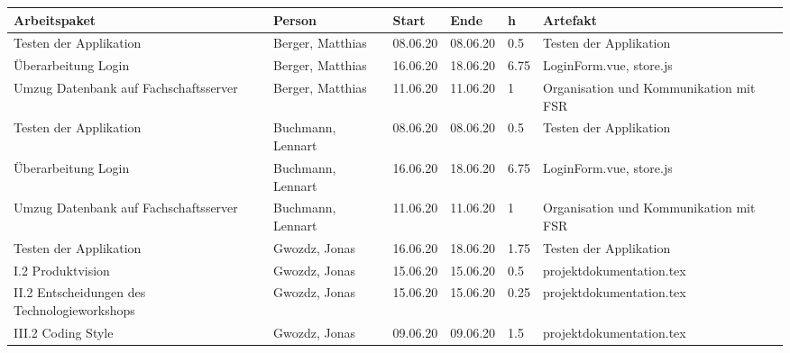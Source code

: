 \begin{longtable}{|p{4cm}|p{2cm}|p{1.2cm}|p{1.2cm}|p{0.7cm}|p{3.8cm}|}
      \hline
      Arbeitspaket                                                           & Person                & Start    & Ende     & h    & Artefakt                                                  \\ \hline
      Testen der Applikation                                                 & Berger, Matthias      & 08.06.20 & 08.06.20 & 0.5  & Testen der Applikation                                    \\ \hline
      Überarbeitung Login                                                    & Berger, Matthias      & 16.06.20 & 18.06.20 & 6.75 & LoginForm.vue, store.js                                   \\ \hline
      Umzug Datenbank auf Fachschaftsserver                                  & Berger, Matthias      & 11.06.20 & 11.06.20 & 1    & Organisation und Kommunikation mit FSR                    \\ \hline
      Testen der Applikation                                                 & Buchmann, Lennart     & 08.06.20 & 08.06.20 & 0.5  & Testen der Applikation                                    \\ \hline
      Überarbeitung Login                                                    & Buchmann, Lennart     & 16.06.20 & 18.06.20 & 6.75 & LoginForm.vue, store.js                                   \\ \hline
      Umzug Datenbank auf Fachschaftsserver                                  & Buchmann, Lennart     & 11.06.20 & 11.06.20 & 1    & Organisation und Kommunikation mit FSR                    \\ \hline
      Testen der Applikation                                                 & Gwozdz, Jonas         & 16.06.20 & 18.06.20 & 1.75 & Testen der Applikation                                    \\ \hline
      I.2 Produktvision                                                      & Gwozdz, Jonas         & 15.06.20 & 15.06.20 & 0.5  & projektdokumentation.tex                                  \\ \hline
      II.2 Entscheidungen des Technologieworkshops                           & Gwozdz, Jonas         & 15.06.20 & 15.06.20 & 0.25 & projektdokumentation.tex                                  \\ \hline
      III.2 Coding Style                                                     & Gwozdz, Jonas         & 09.06.20 & 09.06.20 & 1.5  & projektdokumentation.tex                                  \\ \hline

\end{longtable}
